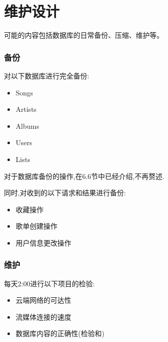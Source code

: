 \chapter{维护设计}
可能的内容包括数据库的日常备份、压缩、维护等。

\subsection{备份}

对以下数据库进行完全备份:
\begin{itemize}
	\item Songs
	\item Artists
	\item Albums
	\item Users
	\item Lists
\end{itemize}

对于数据库备份的操作,在6.6节中已经介绍,不再赘述.

同时,对收到的以下请求和结果进行备份:
\begin{itemize}
	\item 收藏操作
	\item 歌单创建操作
	\item 用户信息更改操作
\end{itemize}

\subsection{维护}

每天2:00进行以下项目的检验:
\begin{itemize}
	\item 云端网络的可达性
	\item 流媒体连接的速度
	\item 数据库内容的正确性(检验和)
\end{itemize}
